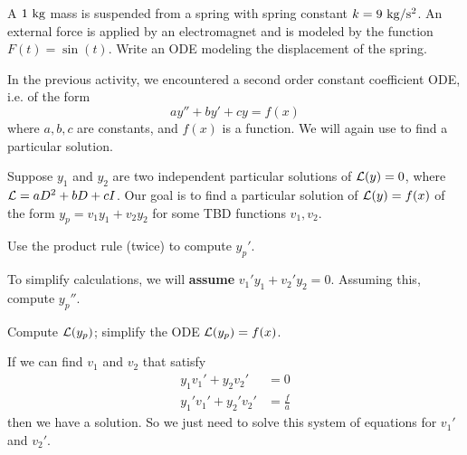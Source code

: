 
\begin{applicationActivities}


\begin{activity}{10}
A \(1\ {\rm kg}\) mass is suspended from a spring with spring constant \(k= 9\ {\rm kg/s^2}\).  An external force is applied by an electromagnet and is modeled by the function \(F(t)=\sin(t)\).  Write an ODE modeling the displacement of the spring.
\end{activity}

\begin{observation}
In the previous activity, we encountered a  second order constant coefficient ODE, i.e. of the form
\[ay''+by'+cy=f(x)\]
where \(a,b,c\) are constants, and \(f(x)\) is a function.
\vfill
We will again use  to find a particular solution.
\vfill
\end{observation}

\begin{activity}{15}
Suppose \(y_1\) and \(y_2\) are two independent particular solutions of \(\mathcal{L}(y)=0\), where \(\mathcal{L}=aD^2+bD+cI\).  
\vfill
Our goal is to find a particular solution of \(\mathcal{L}(y)=f(x)\) of the form \(y_p = v_1 y_1 + v_2 y_2\) for some TBD functions \(v_1,v_2\).
\vfill
\begin{subactivity}
Use the product rule (twice) to compute \(y_p'\).
\end{subactivity}

\begin{subactivity} To simplify calculations, we will \textbf{assume} \(v_1'y_1+v_2'y_2=0\).  Assuming this, compute \(y_p''\).
\end{subactivity}

\begin{subactivity}
Compute \(\mathcal{L}(y_p)\); simplify the ODE \(\mathcal{L}(y_p)=f(x)\).
\end{subactivity}
\vfill
\end{activity}

\begin{observation}
If we can find \(v_1\) and \(v_2\) that satisfy
\begin{alignat*}{2}
y_1 v_1' + y_2 v_2'&=0 \\
y_1' v_1' + y_2' v_2'&=\frac{f}{a} 
\end{alignat*}
then we have a solution.  So we just need to solve this system of equations for \(v_1'\) and \(v_2'\).


\end{observation}
\end{applicationActivities}
